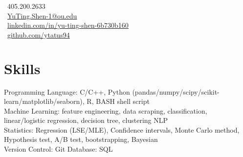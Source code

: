 \documentclass[letterpaper]{deedy-resume-openfont}
\begin{document}
%
%
\lastupdated

%
%

{
    \faPhone \ 405.200.2633\\
    \faEnvelope \ \href{mailto:YuTing.Shen-1@ou.edu}{YuTing.Shen-1@ou.edu}\\
    \faLinkedinSquare \ \href{https://www.linkedin.com/in/yu-ting-shen-6b730b160/}{linkedin.com/in/yu-ting-shen-6b730b160}\\
    \faGithub \ \href{https://github.com/ytatus94}{github.com/ytatus94}
}




\section{Skills}

\raggedright{
    Programming Language:
    C/C++,
    Python (pandas/numpy/scipy/scikit-learn/matplotlib/seaborn),
    R,
    BASH shell script\\
    Machine Learning:
    feature engineering,
    data scraping,
    classification,
    linear/logistic regression,
    decision tree,
    clustering
    NLP\\
    Statistics:
    Regression (LSE/MLE),
    Confidence intervals,
    Monte Carlo method,
    Hypothesis test,
    A/B test,
    bootstrapping,
    Bayesian\\
    Version Control:
    Git
    \textbullet{}
    Database:
    SQL\\
}
\sectionsep
\end{document}
